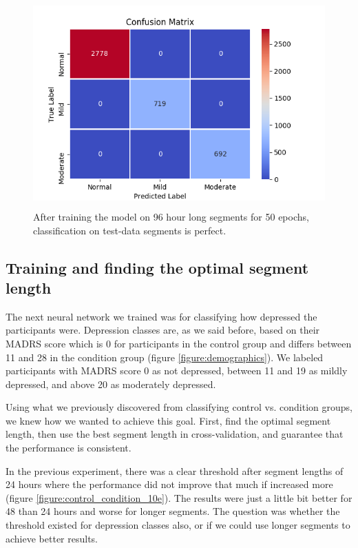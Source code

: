 \begin{figure}[h]
\begin{center}
      \includegraphics[height=8cm]{img/depression_class/conf_5760_60_50_32.png}
      \caption{After training the model on 96 hour long segments for 50 epochs, classification on test-data segments is perfect.}
      \label{figure:depression_class_confusion_matrix_96h}
\end{center}
\end{figure}

\subsection{Training and finding the optimal segment length}

The next neural network we trained was for classifying how depressed the participants were. Depression classes are, as we said before, 
based on their MADRS score which is 0 for participants in the control group and differs between 11 and 28 in the condition group (figure \ref{figure:demographics}). We labeled participants with MADRS score 0 as not depressed, between 11 and 19 as mildly depressed, and above 20 as moderately depressed. 

Using what we previously discovered from classifying control vs. condition groups, we knew how we wanted to achieve this goal. First, find the optimal segment length, then use the best segment length in cross-validation, and guarantee that the performance is consistent. 

In the previous experiment, there was a clear threshold after segment lengths of 24 hours where the performance did not improve that much if increased more (figure \ref{figure:control_condition_10e}). The results were just a little bit better for 48 than 24 hours and worse for longer segments. The question was whether the threshold existed for depression classes also, or if we could use longer segments to achieve better results.

